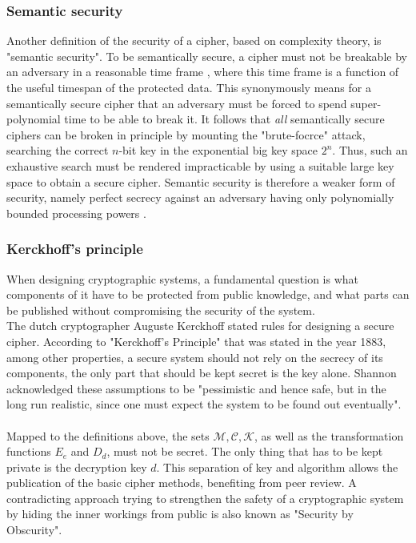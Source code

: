 \subsubsection{Semantic security}

Another definition of the security of a cipher, based on complexity theory, is "semantic security".
To be semantically secure, a cipher must not be breakable by an adversary in a reasonable time
frame \cite{handbook1}, where this time frame is a function of the useful timespan of the protected data. This synonymously means for a semantically secure
cipher that an adversary must be forced to spend super-polynomial time to be able to break it. It follows that \textit{all} semantically secure ciphers
can be broken in principle by mounting the "brute-focrce" attack, searching the correct $n$-bit key in the exponential big key space $2^n$. Thus, such an
exhaustive search must be rendered impracticable by using a suitable large key space to obtain a secure cipher.
Semantic security is therefore a weaker form of security, namely perfect secrecy against an adversary having only polynomially bounded
processing powers \cite{GoldwasserMicali}.

\subsubsection{Kerckhoff's principle}
When designing cryptographic systems, a fundamental question is what components of it have to be protected from public knowledge, and what parts can be
published without compromising the security of the system. 
\\
The dutch cryptographer Auguste Kerckhoff stated rules for designing a secure cipher.
According to "Kerckhoff's Principle" that was stated in the year 1883, among other properties, a secure system should not rely on the secrecy of
its components, the only part that should be kept secret is the key alone. Shannon acknowledged these assumptions to be "pessimistic and hence safe, but 
in the long run realistic, since one must expect the system to be found out eventually".
\\
\\
Mapped to the definitions above, the sets $\mathcal{M, C, K}$, as well as the
transformation functions $E_e$ and $D_d$, must not be secret. The only thing that has to be kept private is the decryption key $d$.
This separation of key and algorithm allows the publication of the basic cipher methods, benefiting from peer review. A contradicting approach 
trying to strengthen the safety of a cryptographic system by hiding the inner workings from public is also known as "Security by Obscurity".

